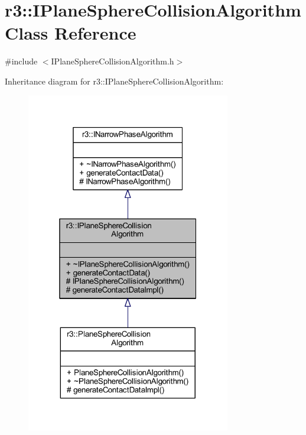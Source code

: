 \hypertarget{classr3_1_1_i_plane_sphere_collision_algorithm}{}\section{r3\+:\+:I\+Plane\+Sphere\+Collision\+Algorithm Class Reference}
\label{classr3_1_1_i_plane_sphere_collision_algorithm}


{\ttfamily \#include $<$I\+Plane\+Sphere\+Collision\+Algorithm.\+h$>$}



Inheritance diagram for r3\+:\+:I\+Plane\+Sphere\+Collision\+Algorithm\+:\nopagebreak
\begin{figure}[H]
\begin{center}
\leavevmode
\includegraphics[width=253pt]{classr3_1_1_i_plane_sphere_collision_algorithm__inherit__graph}
\end{center}
\end{figure}


